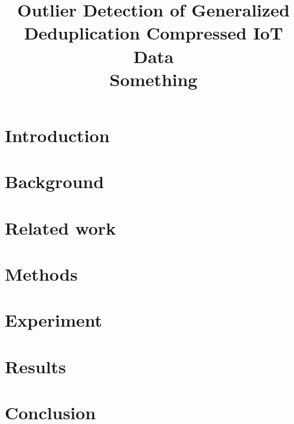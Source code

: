 \documentclass[conference]{IEEEtran}
\begin{document}
\title{Outlier Detection of Generalized Deduplication Compressed IoT Data\\
{\LARGE Something}\\
}

\author{
}

\maketitle
\thispagestyle{plain}
\pagestyle{plain}
\begin{abstract}
\end{abstract}

\begin{IEEEkeywords}
\end{IEEEkeywords}

\section{Introduction}


\section{Background}


\section{Related work}


\section{Methods}


\section{Experiment}


\section{Results}


\section{Conclusion}


\printbibliography[title={References}]
\end{document}
